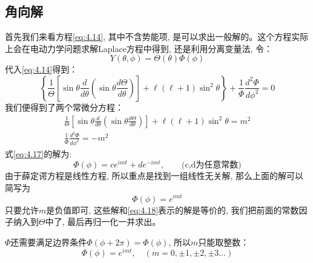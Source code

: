 \documentclass[a4paper,zihao=-4,linespread=1]{ctexrep}
\begin{document}
    \subsection*{角向解}
    首先我们来看方程\ref{eq:4.14}, 其中不含势能项, 是可以求出一般解的。这个方程实际上会在电动力学问题求解Laplace方程中得到, 还是利用分离变量法, 令：
    \[Y(\theta,\phi)=\Theta(\theta)\Phi(\phi)\]
    代入\ref{eq:4.14}得到：
    \begin{equation}
        \left\{\frac{1}{\Theta}\left[\sin \theta \frac{d}{d \theta}\left(\sin \theta \frac{d \Theta}{d \theta}\right)\right]+\ell(\ell+1) \sin ^{2} \theta\right\}+\frac{1}{\Phi} \frac{d^{2} \Phi}{d \phi^{2}}=0
    \end{equation}
    我们便得到了两个常微分方程：
    \begin{gather}
        \frac{1}{\Theta}\left[\sin \theta \frac{d}{d \theta}\left(\sin \theta \frac{d \Theta}{d \theta}\right)\right]+\ell(\ell+1) \sin ^{2} \theta=m^2\label{eq:4.16}\\
        \frac{1}{\Phi} \frac{d^{2} \Phi}{d \phi^{2}}=-m^2\label{eq:4.17}
    \end{gather}
    式\ref{eq:4.17}的解为:
    \begin{equation}
        \label{eq:4.18}
        \Phi(\phi)=ce^{imt}+de^{-imt},\qquad\text{(c,d为任意常数)}
    \end{equation}
    由于薛定谔方程是线性方程, 所以重点是找到一组线性无关解, 那么上面的解可以简写为
    \[\Phi(\phi)=e^{imt}\]
    只要允许$m$是负值即可, 这些解和\ref{eq:4.18}表示的解是等价的, 我们把前面的常数因子纳入到$\Theta$中了, 最后再归一化一并求出。
    
    $\Phi$还需要满足边界条件$\Phi(\phi+2\pi)=\Phi(\phi)$, 所以$m$只能取整数：
    \begin{equation}
        \boxed{\Phi(\phi)=e^{imt}, \quad(m=0,\pm 1,\pm 2,\pm 3\ldots)}
    \end{equation}
\end{document}
